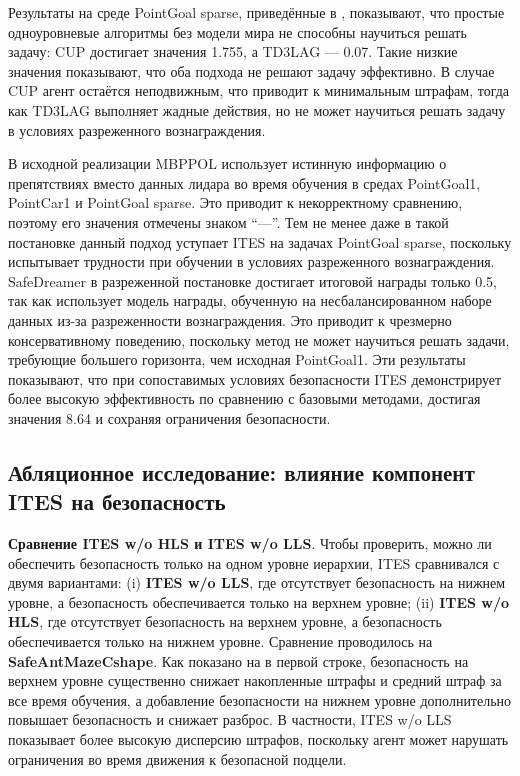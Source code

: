 Результаты на среде PointGoal sparse, приведённые в , показывают, что простые одноуровневые алгоритмы без модели мира не способны научиться решать задачу: CUP достигает значения 1.755, а TD3LAG --- 0.07. Такие низкие значения показывают, что оба подхода не решают задачу эффективно. В случае CUP агент остаётся неподвижным, что приводит к минимальным штрафам, тогда как TD3LAG выполняет жадные действия, но не может научиться решать задачу в условиях разреженного вознаграждения.

В исходной реализации MBPPOL использует истинную информацию о препятствиях вместо данных лидара во время обучения в средах PointGoal1, PointCar1 и PointGoal sparse. Это приводит к некорректному сравнению, поэтому его значения отмечены знаком ``---''. Тем не менее даже в такой постановке данный подход уступает ITES на задачах PointGoal sparse, поскольку испытывает трудности при обучении в условиях разреженного вознаграждения. SafeDreamer в разреженной постановке достигает итоговой награды только 0.5, так как использует модель награды, обученную на несбалансированном наборе данных из-за разреженности вознаграждения. Это приводит к чрезмерно консервативному поведению, поскольку метод не может научиться решать задачи, требующие большего горизонта, чем исходная PointGoal1. Эти результаты показывают, что при сопоставимых условиях безопасности ITES демонстрирует более высокую эффективность по сравнению с базовыми методами, достигая значения 8.64 и сохраняя ограничения безопасности.

\subsection{Абляционное исследование: влияние компонент ITES на безопасность}
\label{subsec:ites_rq4}

\textbf{Сравнение ITES w/o HLS и ITES w/o LLS}. Чтобы проверить, можно ли обеспечить безопасность только на одном уровне иерархии, ITES сравнивался с двумя вариантами: (i) \textbf{ITES w/o LLS}, где отсутствует безопасность на нижнем уровне, а безопасность обеспечивается только на верхнем уровне; (ii) \textbf{ITES w/o HLS}, где отсутствует безопасность на верхнем уровне, а безопасность обеспечивается только на нижнем уровне. Сравнение проводилось на \textbf{SafeAntMazeCshape}. Как показано на  в первой строке, безопасность на верхнем уровне существенно снижает накопленные штрафы и средний штраф за все время обучения, а добавление безопасности на нижнем уровне дополнительно повышает безопасность и снижает разброс. В частности, ITES w/o LLS показывает более высокую дисперсию штрафов, поскольку агент может нарушать ограничения во время движения к безопасной подцели.

